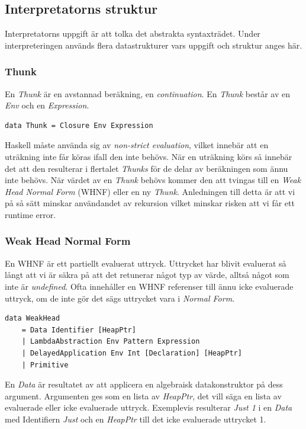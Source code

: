 \subsection{Interpretatorns struktur}
Interpretatorns uppgift är att tolka det abstrakta syntaxträdet. Under interpreteringen används flera datastrukturer vars uppgift och struktur anges här.

\subsubsection{Thunk}
En \emph{Thunk} är en avstannad beräkning, en \emph{continuation}. En \emph{Thunk} består av en \emph{Env} och en \emph{Expression}.

\begin{lstlisting}
data Thunk = Closure Env Expression
\end{lstlisting}

Haskell måste använda sig av \emph{non-strict evaluation}, vilket innebär att en uträkning inte får köras ifall den inte behövs. När en uträkning körs så innebär det att den resulterar i flertalet \emph{Thunks} för de delar av beräkningen som ännu inte behövs. När värdet av en \emph{Thunk} behövs kommer den att tvingas till en \emph{Weak Head Normal Form} (WHNF) eller en ny \emph{Thunk}. Anledningen till detta är att vi på så sätt minskar användandet av rekursion vilket minskar risken att vi får ett runtime error.

\subsubsection{Weak Head Normal Form}
En WHNF är ett partiellt evaluerat uttryck. Uttrycket har blivit evaluerat så långt att vi är säkra på att det retunerar något typ av värde, alltså något som inte är \emph{undefined}. Ofta innehåller en WHNF referenser till ännu icke evaluerade uttryck, om de inte gör det sägs uttrycket vara i \emph{Normal Form}.

\begin{lstlisting}
data WeakHead 
    = Data Identifier [HeapPtr]
    | LambdaAbstraction Env Pattern Expression
    | DelayedApplication Env Int [Declaration] [HeapPtr]
    | Primitive
\end{lstlisting}

En \emph{Data} är resultatet av att applicera en algebraisk datakonstruktor på dess argument. Argumenten ges som en lista av \emph{HeapPtr}, det vill säga en lista av evaluerade eller icke evaluerade uttryck. Exemplevis resulterar \emph{Just 1} i en \emph{Data} med Identifiern \emph{Just} och en \emph{HeapPtr} till det icke evaluerade uttrycket 1.

